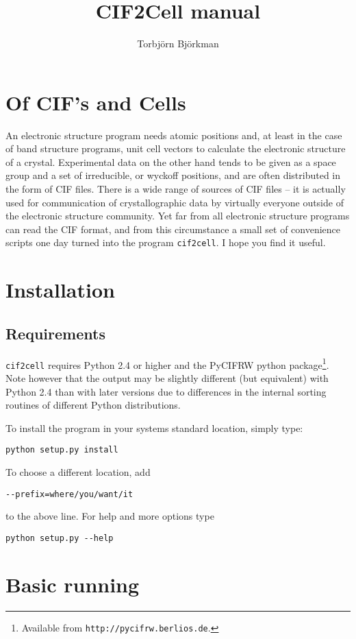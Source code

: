 \documentclass[11pt]{article}
\title{CIF2Cell manual}
\author{Torbj\"orn Bj\"orkman}
\newcommand{\ciftocell}{\texttt{cif2cell}}
\begin{document}
\maketitle
\section{Of CIF's and Cells}
An electronic structure program needs atomic positions and, at least in the case of band structure programs, unit cell vectors to calculate the electronic structure of a crystal. Experimental data on the other hand tends to be given as a space group and a set of irreducible, or wyckoff positions, and are often distributed in the form of CIF files. There is a wide range of sources of CIF files -- it is actually used for communication of crystallographic data by virtually everyone outside of the electronic structure community. Yet far from all electronic structure programs can read the CIF format, and from this circumstance a small set of convenience scripts one day turned into the program \ciftocell. I hope you find it useful.

\section{Installation}
\subsection{Requirements}
\ciftocell{} requires Python 2.4 or higher and the PyCIFRW python package\footnote{Available from \texttt{http://pycifrw.berlios.de}.}. Note however that the output may be slightly different (but equivalent) with Python 2.4 than with later versions due to differences in the internal sorting routines of different Python distributions.

To install the program in your systems standard location, simply type:
\begin{verbatim}
python setup.py install 
\end{verbatim}
To choose a different location, add 
\begin{verbatim}
--prefix=where/you/want/it 
\end{verbatim}
to the above line. For help and more options type
\begin{verbatim}
python setup.py --help
\end{verbatim}


\section{Basic running}
\end{document}
